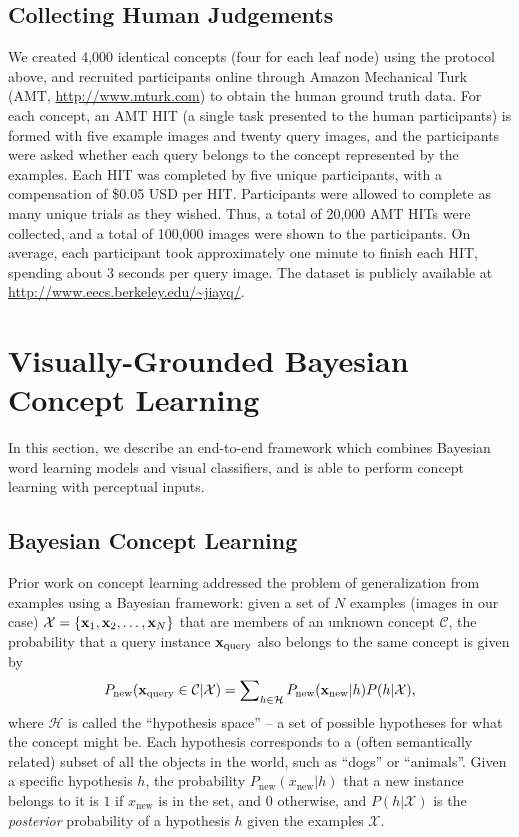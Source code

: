 \subsection{Collecting Human Judgements}

We created 4,000 identical concepts (four for each leaf node) using the protocol above, and recruited participants online through Amazon Mechanical Turk (AMT, \url{http://www.mturk.com}) to obtain the human ground truth data. For each concept, an AMT HIT (a single task presented to the human participants) is formed with five example images and twenty query images, and the participants were asked whether each query belongs to the concept represented by the examples. Each HIT was completed by five unique participants, with a compensation of \$0.05 USD per HIT. Participants were allowed to complete as many unique trials as they wished. Thus, a total of 20,000 AMT HITs were collected, and a total of 100,000 images were shown to the participants. On average, each participant took approximately one minute to finish each HIT, spending about 3 seconds per query image. The dataset is publicly available at \url{http://www.eecs.berkeley.edu/~jiayq/}.

\section{Visually-Grounded Bayesian Concept Learning}

In this section, we describe an end-to-end framework which combines Bayesian word learning models and visual classifiers, and is able to perform concept learning with perceptual inputs. 

\subsection{Bayesian Concept Learning}
Prior work on concept learning \cite{xu2007word} addressed the problem of generalization from examples using a Bayesian framework: given a set of $N$ examples (images in our case) $\mathcal{X} = \{ \mathbf{x}_1, \mathbf{x}_2,\ldots, \mathbf{x}_N \}$ that are members of an unknown concept $\mathcal{C}$, the probability that a query instance $\mathbf{x}_\mathrm{query}$ also belongs to the same concept is given by
\begin{equation}
P_{\mathrm{new}}(\mathbf{x}_\mathrm{query} \in \mathcal{C}|\mathcal{X}) = \sum\nolimits_{h \in \mathcal{H}} P_{\mathrm{new}}(\mathbf{x}_\mathrm{new} | h)P(h|\mathcal{X}), \label{eq:bayeswl}
\end{equation}
where $\mathcal{H}$ is called the ``hypothesis space'' -- a set of possible hypotheses for what the concept might be. Each hypothesis corresponds to a (often semantically related) subset of all the objects in the world, such as ``dogs'' or ``animals''. Given a specific hypothesis $h$, the probability $P_{\mathrm{new}}(x_\mathrm{new}|h)$ that a new instance belongs to it is $1$ if $x_\mathrm{new}$ is in the set, and $0$ otherwise, and $P(h | \mathcal{X})$ is the \emph{posterior} probability of a hypothesis $h$ given the examples $\mathcal{X}$.

